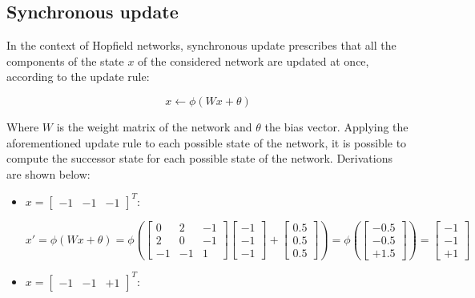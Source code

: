 \documentclass[letterpaper,headings=standardclasses]{scrartcl}
\begin{document}
\subsection{Synchronous update}

In the context of Hopfield networks, synchronous update prescribes that all the components of the state $x$ of the considered network are updated at once, according to the update rule:

$$ x \leftarrow \phi(Wx + \theta) $$

Where $W$ is the weight matrix of the network and $\theta$ the bias vector. Applying the aforementioned update rule to each possible state of the network, it is possible to compute the successor state for each possible state of the network. Derivations are shown below:

\begin{itemize}
    \item $x = [\begin{matrix} -1 & -1 & -1 \end{matrix}]^T$:
    
    $$ x' = \phi(Wx + \theta) = \phi \left( \left[ \begin{matrix} 0 & 2 & -1 \\ 2 & 0 & -1 \\ -1 & -1 & 1 \end{matrix} \right] \left[ \begin{matrix} -1 \\ -1 \\ -1 \end{matrix} \right] + \left[ \begin{matrix} 0.5 \\ 0.5 \\ 0.5 \end{matrix} \right] \right) = \phi \left( \left[ \begin{matrix} -0.5 \\ -0.5 \\ +1.5 \end{matrix} \right] \right) = \left[ \begin{matrix} -1 \\ -1 \\ +1 \end{matrix} \right] $$

    \item $x = [\begin{matrix} -1 & -1 & +1 \end{matrix}]^T$:
    

\end{itemize}
\end{document}
